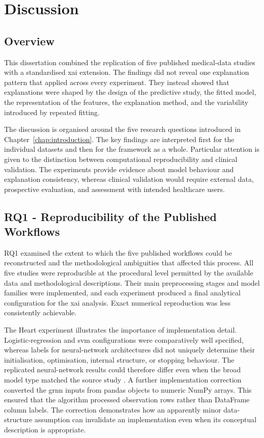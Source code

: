 \chapter{Discussion}
\label{chap:discussion}

\section{Overview}

This dissertation combined the replication of five published medical-data studies with a standardised \gls{xai} extension. The findings did not reveal one explanation pattern that applied across every experiment. They instead showed that explanations were shaped by the design of the predictive study, the fitted model, the representation of the features, the explanation method, and the variability introduced by repeated fitting.

The discussion is organised around the five research questions introduced in Chapter~\ref{chap:introduction}. The key findings are interpreted first for the individual datasets and then for the framework as a whole. Particular attention is given to the distinction between computational reproducibility and clinical validation. The experiments provide evidence about model behaviour and explanation consistency, whereas clinical validation would require external data, prospective evaluation, and assessment with intended healthcare users.

\section{RQ1 - Reproducibility of the Published Workflows}

RQ1 examined the extent to which the five published workflows could be reconstructed and the methodological ambiguities that affected this process. All five studies were reproducible at the procedural level permitted by the available data and methodological descriptions. Their main preprocessing stages and model families were implemented, and each experiment produced a final analytical configuration for the \gls{xai} analysis. Exact numerical reproduction was less consistently achievable.

The Heart experiment illustrates the importance of implementation detail. Logistic-regression and \gls{svm} configurations were comparatively well specified, whereas labels for neural-network architectures did not uniquely determine their initialisation, optimisation, internal structure, or stopping behaviour. The replicated neural-network results could therefore differ even when the broad model type matched the source study \citep{khanna_comparative_2015}. A further implementation correction converted the \gls{grnn} inputs from pandas objects to numeric NumPy arrays. This ensured that the algorithm processed observation rows rather than DataFrame column labels. The correction demonstrates how an apparently minor data-structure assumption can invalidate an implementation even when its conceptual description is appropriate.

